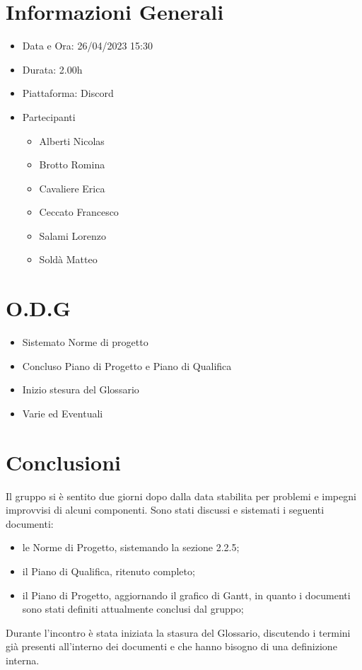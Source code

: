 \documentclass[a4paper, 12pt]{article}
\begin{document}
\makefrontpage

\section*{Informazioni Generali}
\begin{itemize}
    \item Data e Ora: 26/04/2023 15:30
    \item Durata: 2.00h
    \item Piattaforma: Discord
    \item Partecipanti
    \begin{itemize}
        \item Alberti Nicolas
        \item Brotto Romina
        \item Cavaliere Erica
        \item Ceccato Francesco
        \item Salami Lorenzo
        \item Soldà Matteo
    \end{itemize}
\end{itemize}

\section*{O.D.G}
\begin{itemize}
    \item Sistemato Norme di progetto
    \item Concluso Piano di Progetto e Piano di Qualifica
    \item Inizio stesura del Glossario
    \item Varie ed Eventuali
\end{itemize}

\section*{Conclusioni}
Il gruppo si è sentito due giorni dopo dalla data stabilita per problemi e impegni improvvisi di alcuni componenti.\newline
Sono stati discussi e sistemati i seguenti documenti:
\begin{itemize}
    \item le Norme di Progetto, sistemando la sezione 2.2.5;
    \item il Piano di Qualifica, ritenuto completo;
    \item il Piano di Progetto, aggiornando il grafico di Gantt, in quanto i documenti sono stati definiti attualmente conclusi dal gruppo;
\end{itemize}
Durante l'incontro è stata iniziata la stasura del Glossario, discutendo i termini già presenti all'interno dei documenti e che hanno bisogno di una definizione interna.
\end{document}
